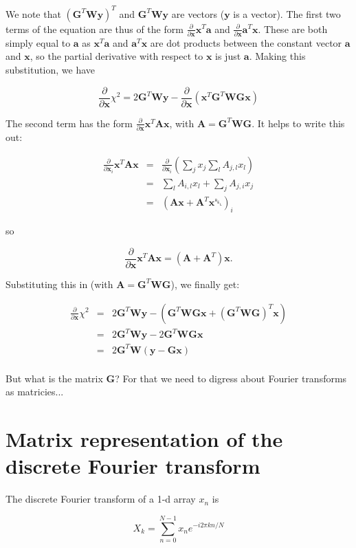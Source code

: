 \documentclass[12pt]{article}
\newcommand{\G}{\mathbf{G}}
\newcommand{\x}{\mathbf{x}}
\newcommand{\y}{\mathbf{y}}
\newcommand{\W}{\mathbf{W}}
\newcommand{\A}{\mathbf{A}}
\newcommand{\avec}{\mathbf{a}}
\newcommand{\ddx}{\frac{\partial}{\partial \mathbf{x}}}
\newcommand{\ddxi}{\frac{\partial}{\partial \mathbf{x}_{i}}}
\begin{document}
We note that $(\G^{T} \W \y)^{T}$ and $\G^{T} \W \y$ are vectors ($\y$ is a
vector). The first two terms of the equation are thus of the form $\ddx \x^T \avec$
and $\ddx \avec^T \x$. These are both simply equal to $\avec$ as $\x^T \avec$ and
$\avec^T \x$ are dot products between the constant vector $\avec$ and $\x$, so the
partial derivative with respect to $\x$ is just $\avec$. Making this substitution,
we have

\begin{equation}
\ddx \chi^{2} = 2 \G^T \W \y - \ddx \left( \x^{T} \G^{T} \W \G \x \right)
\end{equation}

The second term has the form $\ddx \x^T\A\x$, with
$\A = \G^T \W \G$. It helps to write this out:

\begin{eqnarray*}
  \ddxi \x^{T}\A\x & = & \ddxi \left( \sum_{j} x_{j} \sum_l A_{j,l} x_{l}  \right) \\
                   & = & \sum_l A_{i,l} x_{l} + \sum_j A_{j,i} x_{j} \\
                   & = & \left( \A \x + \A^{T} \x␇ \right)_{i}
\end{eqnarray*}

so

\begin{equation}
  \ddx \x^T\A\x = (\A + \A^T) \x .
\end{equation}

Substituting this in (with $\A = \G^T \W \G$), we finally get:

\begin{eqnarray*}
\ddx \chi^{2} & = & 2 \G^T \W \y - \left( \G^T \W \G \x + (\G^T \W \G)^T \x \right) \\
              & = & 2 \G^T \W \y - 2 \G^T \W \G \x \\
              & = & 2 \G^T \W ( \y - \G \x ) \\
\end{eqnarray*}

But what is the matrix $\G$? For that we need to digress about Fourier transforms
as matricies...

\section{Matrix representation of the discrete Fourier transform}

The discrete Fourier transform of a 1-d array $x_n$ is

\begin{equation}
X_k = \sum_{n=0}^{N-1} x_n e^{-i 2 \pi k n / N}
\end{equation}
\end{document}
